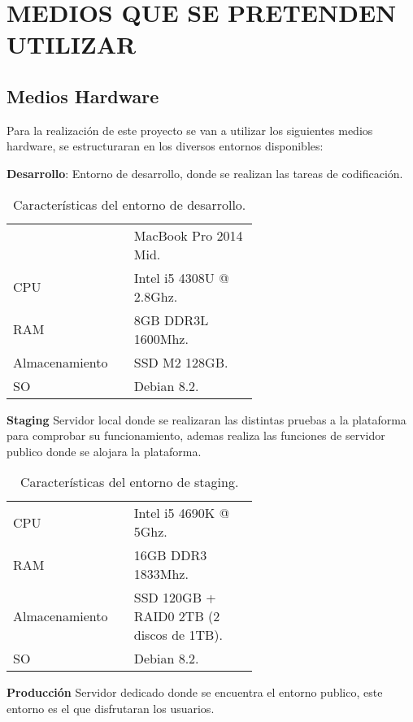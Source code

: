 \documentclass{pre-tfg}
\begin{document}
\section{MEDIOS QUE SE PRETENDEN UTILIZAR}

\subsection{Medios Hardware}
Para la realización de este proyecto se van a utilizar los siguientes
medios hardware, se estructuraran en los diversos entornos
disponibles:


\textbf{Desarrollo}:
Entorno de desarrollo, donde se realizan las tareas de codificación.

\begin{table}[hp]
  \caption{Características del entorno de desarrollo.}
  \centering

  \begin{tabular}{p{0.2\linewidth}p{0.4\linewidth}}
    & MacBook Pro 2014 Mid.\\
    CPU& Intel i5 4308U @ 2.8Ghz.\\
    RAM& 8GB DDR3L 1600Mhz.\\
    Almacenamiento& SSD M2 128GB.\\
    SO& Debian 8.2.\\
  \end{tabular}
\end{table}

\textbf{Staging}
Servidor local donde se realizaran las distintas pruebas a la
plataforma para comprobar su funcionamiento, ademas realiza las
funciones de servidor publico donde se alojara la plataforma.

\begin{table}[hp]
  \caption{Características del entorno de staging.}
  \centering

  \begin{tabular}{p{0.2\linewidth}p{0.4\linewidth}}
    CPU& Intel i5 4690K @ 5Ghz.\\
    RAM& 16GB DDR3 1833Mhz.\\
    Almacenamiento& SSD 120GB + RAID0 2TB (2 discos de 1TB).\\
    SO& Debian 8.2.\\
  \end{tabular}
\end{table}

\textbf{Producción}
Servidor dedicado donde se encuentra el entorno publico, este entorno
es el que disfrutaran los usuarios.
\end{document}

